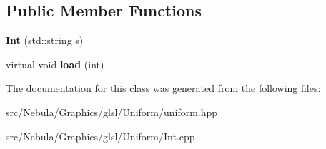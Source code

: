 \subsection*{\-Public \-Member \-Functions}
\begin{DoxyCompactItemize}
\item 
\hypertarget{classNeb_1_1glsl_1_1Uniform_1_1Scalar_1_1Int_afc2e77242ed6bbb588978085f515a7bf}{{\bfseries \-Int} (std\-::string s)}\label{classNeb_1_1glsl_1_1Uniform_1_1Scalar_1_1Int_afc2e77242ed6bbb588978085f515a7bf}

\item 
\hypertarget{classNeb_1_1glsl_1_1Uniform_1_1Scalar_1_1Int_a2d63b9bc35ba2d1773c9eb3429e00b3d}{virtual void {\bfseries load} (int)}\label{classNeb_1_1glsl_1_1Uniform_1_1Scalar_1_1Int_a2d63b9bc35ba2d1773c9eb3429e00b3d}

\end{DoxyCompactItemize}


\-The documentation for this class was generated from the following files\-:\begin{DoxyCompactItemize}
\item 
src/\-Nebula/\-Graphics/glsl/\-Uniform/uniform.\-hpp\item 
src/\-Nebula/\-Graphics/glsl/\-Uniform/\-Int.\-cpp\end{DoxyCompactItemize}
